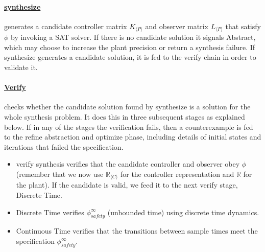 \documentclass[sigconf]{llncs}
\newcommand{\mat}[1]{{#1}}
\begin{document}
\paragraph{\underline{{\sc synthesize}}} generates a candidate controller matrix $\mat{K}_{\langle P \rangle}$
and observer matrix $\mat{L}_{\langle P \rangle}$ that satisfy
$\phi$ by invoking a SAT solver.
If there is no candidate solution it signals {\sc Abstract}, 
which may choose to increase the plant precision or return a synthesis failure.
If {\sc synthesize} generates a candidate solution, it is fed to the {\sc verify} chain in order to validate it.
%
\paragraph{\underline{{\sc Verify}}} checks whether the candidate
solution found by {\sc synthesize} is a solution for the whole synthesis
problem. It does this in three subsequent stages as explained below.
If  in any of the stages the verification fails, then
a counterexample is fed to the {\sc refine abstraction and optimize} phase,
including details of initial states
and iterations that failed the specification.
\begin{itemize}
\item {\sc verify synthesis}
verifies that the candidate controller
and observer obey $\phi$ (remember that we now use
$\mathbb{R}_{\langle C \rangle}$ for the controller representation
and $\mathbb{R}$ for the plant).  %
If the candidate is valid, we feed
it to the next {\sc verify} stage, {\sc Discrete Time}.
\item {\sc Discrete Time} verifies $\phi_\mathit{safety}^{\infty}$ (unbounded time)
using discrete time dynamics.  %
\item {\sc Continuous Time} verifies that the
transitions between sample times meet the specification $\phi_\mathit{safety}^{\infty}$.  %
\end{itemize}

\end{document}
